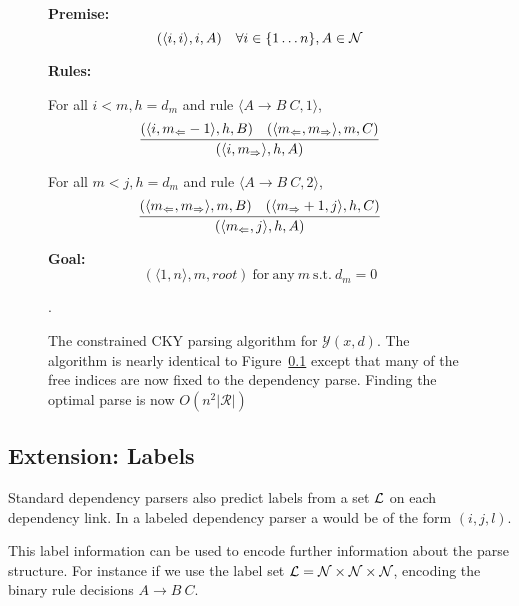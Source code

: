 \documentclass[11pt,letterpaper]{article}
\newcommand{\nonterms}{\mathcal{N}}
\newcommand{\rules}{\mathcal{R}}
\newcommand{\Left}[1]{#1_{\Leftarrow}}
\newcommand{\Right}[1]{#1_{\Rightarrow}}
\newcommand{\Span}[1]{\langle #1 \rangle}
\newcommand{\Root}{root}
\newcommand{\tri}{\Span{\Left{m}, \Right{m}}}
\begin{document}
\begin{figure}
  \noindent \textbf{Premise:}
  \[(\langle i,i \rangle, i, A)\ \ \ \forall i \in \{1 \ldots n\}, A \in {\cal N}\]

  \noindent\textbf{Rules:}



   For all   $i < m, h = d_m$  and rule  $\langle A \rightarrow B\ C, 1 \rangle$,
  \[\infer{( \Span{ i, \Right{m} }, h, A)}{(\Span{i, \Left{m}-1}, h, B)  &  (\tri, m, C) } \]

  For all    $m < j, h = d_m$ and  rule  $\langle A \rightarrow B\ C, 2\rangle$,
  \[ \infer{( \Span{\Left{m}, j}, h, A)}{(\tri, m, B)  &  (\Span{\Right{m}+ 1, j}, h, C) } \]



\noindent \textbf{Goal:}\[ (\Span{1, n}, m, \Root) \mathrm{\ for\ any }\ m \mathrm{\ s.t. \ } d_m = 0  \]

\caption{The constrained CKY parsing algorithm for $\mathcal{Y}(x, d)$. The algorithm is nearly identical to Figure~\ref{} except that many of the free indices are now fixed to the dependency parse. Finding the optimal parse is now $O(n^2|\rules|)$}.
\end{figure}



\subsection{Extension: Labels}


Standard dependency parsers also predict labels from a set ${\cal L}$ on each dependency link.
In a labeled dependency parser a would be of the form $(i, j, l)$.

This label information can be used to encode further information about the parse structure. For instance
if we use the label set ${\cal L} = \nonterms \times \nonterms \times \nonterms$, encoding the binary rule decisions $A \rightarrow B\ C$.
\end{document}
